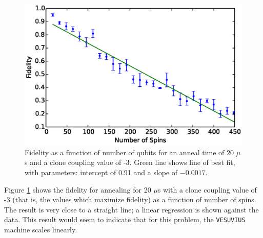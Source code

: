 \begin{figure}
	\includegraphics{img/trend.eps}
	\caption[Fidelity vs Number of Qubits]{Fidelity as a function of number of qubits for an anneal time of 20 $\mu$s and a clone coupling value of -3.  Green line shows line of best fit, with parameters: intercept of 0.91 and a slope of $-0.0017$.}
	\label{fig:trend}
\end{figure}

Figure \ref{fig:trend} shows the fidelity for annealing for 20 $\mu$s with a clone coupling value of -3 (that is, the values which maximize fidelity) as a function of number of spins.  The result is very close to a straight line; a linear regression is shown against the data.  This result would seem to indicate that for this problem, the \texttt{VESUVIUS} machine scales linearly.
